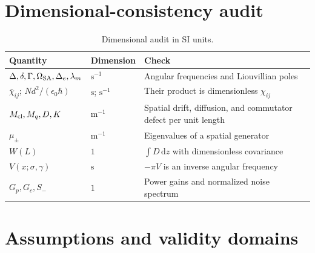 \documentclass[11pt,a4paper]{article}
\newcommand{\dd}{\mathrm d}
\newcommand{\chibar}{\bar\chi}
\begin{document}
\section{Dimensional-consistency audit}

\begin{table}[ht]
\centering
\caption{Dimensional audit in SI units.}
\label{tab:dimension-audit}
\small
\begin{tabularx}{\textwidth}{L{4.1cm}L{3.0cm}Y}
\toprule
Quantity & Dimension & Check\\
\midrule
$\Delta,\delta,\Gamma,\Omega_{\rm SA},\Delta_e,\lambda_m$ &
$\mathrm{s}^{-1}$ & Angular frequencies and Liouvillian poles\\
$\chibar_{ij}$; $Nd^2/(\epsilon_0\hbar)$ &
$\mathrm{s}$; $\mathrm{s}^{-1}$ & Their product is dimensionless $\chi_{ij}$\\
$M_{\rm cl},M_q,D,K$ & $\mathrm{m}^{-1}$ & Spatial drift, diffusion, and
commutator defect per unit length\\
$\mu_\pm$ & $\mathrm{m}^{-1}$ & Eigenvalues of a spatial generator\\
$W(L)$ & $1$ & $\int D\,\dd z$ with dimensionless covariance\\
$V(x;\sigma,\gamma)$ & $\mathrm{s}$ & $-\pi V$ is an inverse angular frequency\\
$G_p,G_c,S_-$ & $1$ & Power gains and normalized noise spectrum\\
\bottomrule
\end{tabularx}
\end{table}

\section{Assumptions and validity domains}
\label{app:assumptions}
\end{document}
